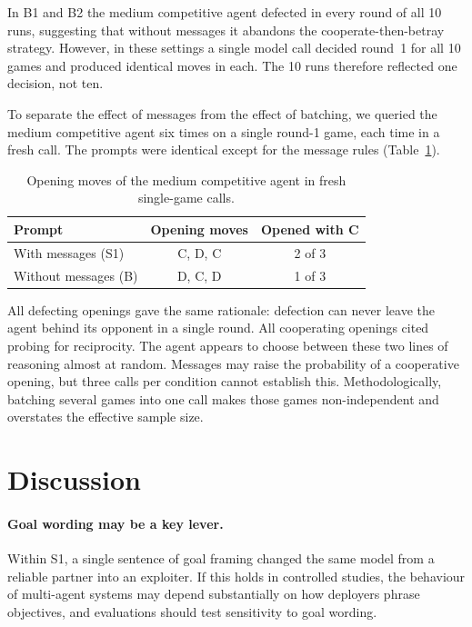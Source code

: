 \documentclass[11pt,a4paper]{article}
\begin{document}
In B1 and B2 the medium competitive agent defected in every round of all 10 runs, suggesting that without messages it abandons the cooperate-then-betray strategy. However, in these settings a single model call decided round~1 for all 10 games and produced identical moves in each. The 10 runs therefore reflected one decision, not ten.

To separate the effect of messages from the effect of batching, we queried the medium competitive agent six times on a single round-1 game, each time in a fresh call. The prompts were identical except for the message rules (Table~\ref{tab:check}).

\begin{table}[htbp]
\centering
\caption{Opening moves of the medium competitive agent in fresh single-game calls.}
\label{tab:check}
\begin{tabular}{@{}lcc@{}}
\toprule
Prompt & Opening moves & Opened with C \\
\midrule
With messages (S1)    & C, D, C & 2 of 3 \\
Without messages (B)  & D, C, D & 1 of 3 \\
\bottomrule
\end{tabular}
\end{table}

All defecting openings gave the same rationale: defection can never leave the agent behind its opponent in a single round. All cooperating openings cited probing for reciprocity. The agent appears to choose between these two lines of reasoning almost at random. Messages may raise the probability of a cooperative opening, but three calls per condition cannot establish this. Methodologically, batching several games into one call makes those games non-independent and overstates the effective sample size.

\section{Discussion}

\paragraph{Goal wording may be a key lever.} Within S1, a single sentence of goal framing changed the same model from a reliable partner into an exploiter. If this holds in controlled studies, the behaviour of multi-agent systems may depend substantially on how deployers phrase objectives, and evaluations should test sensitivity to goal wording.
\end{document}
